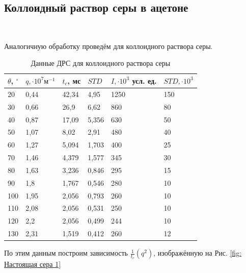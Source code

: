 \documentclass{article}
\begin{document}
\subsection{Коллоидный раствор серы в ацетоне}\
\par Аналогичную обработку проведём для коллоидного раствора серы.
\begin{table}[h!]
\centering
\caption{Данные ДРС для коллоидного раствора серы}
\label{Таблица 1}
\begin{tabular}{|l|l|l|l|l|l|}
\hline
$\theta$, $^{\circ}$ & $q, \cdot 10^7 \text{м}^{-1}$  & $t_{c}$, мс & $STD$ & $I, \cdot 10^3$ усл. ед. & $STD, \cdot 10^3$ \\ \hline
20  & 0,44 & 42,34        & 4,95  & 1250           & 150                \\ \hline
30  & 0,66 & 26,9         & 6,62  & 860            & 80                 \\ \hline
40  & 0,87 & 17,09        & 5,356 & 630            & 50                 \\ \hline
50  & 1,07 & 8,02         & 2,91  & 480            & 40                 \\ \hline
60  & 1,27 & 5,094        & 1,703 & 400            & 25                 \\ \hline
70  & 1,46 & 4,379        & 1,577 & 345            & 30                 \\ \hline
80  & 1,63 & 3,236        & 0,846 & 295            & 15                 \\ \hline
90  & 1,8  & 1,767        & 0,546 & 280            & 10                 \\ \hline
100 & 1,95 & 2,056        & 0,793 & 260            & 10                 \\ \hline
110 & 2,08 & 2,056        & 0,531 & 250            & 10                 \\ \hline
120 & 2,2  & 2,056        & 0,499 & 244            & 10                 \\ \hline
130 & 2,31 & 1,519        & 0,412 & 260            & 12                 \\ \hline
\end{tabular}
\end{table}
\par По этим данным построим зависимость $\frac{1}{t_c}(q^2)$, изображённую на Рис. \ref{fig: Настоящая сера 1}
\end{document}
